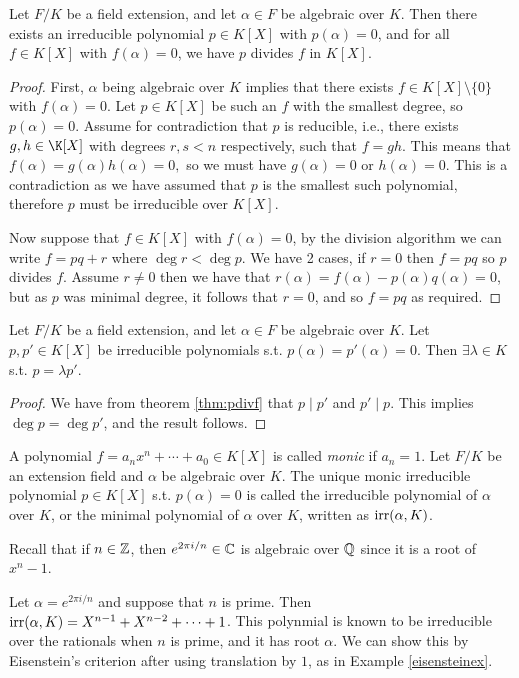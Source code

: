 \begin{theorem}
  Let $F/K$ be a field extension, and let $\alpha\in F$ be algebraic over $K$.
  Then there exists an irreducible polynomial $p\in K[X]$ with $p(\alpha)=0$, and for
  all $f\in K[X]$ with $f(\alpha)=0$, we have $p$ divides $f$ in $K[X]$. \label{thm:pdivf}
\end{theorem}
\begin{proof}
  First, $\alpha$ being algebraic over $K$ implies that there exists $f\in K[X]\setminus \{0\}$ with $f(\alpha)=0$. Let $p\in K[X]$ be such an $f$ with the smallest degree, so $p(\alpha)=0.$ Assume for contradiction that $p$ is reducible, i.e., there exists $g,h\in\K[X]$ with degrees $r,s<n$ respectively, such that $f=gh.$ This means that $f(\alpha)=g(\alpha)h(\alpha)=0,$ so we must have $g(\alpha)=0$ or $h(\alpha)=0.$ This is a contradiction as we have assumed that $p$ is the smallest such polynomial, therefore $p$ must be irreducible over $K[X].$

  Now suppose that $f \in K[X]$ with $f(\alpha) = 0$, by the division algorithm we can write $f=pq+r$ where $\deg r < \deg p$. We have 2 cases, if $r=0$ then $f = pq$ so $p$ divides $f$. Assume $r \neq 0$ then we have that $r(\alpha) = f(\alpha) - p(\alpha)q(\alpha) = 0$, but as $p$ was minimal degree, it follows that $r = 0$, and so $f=pq$ as required.
\end{proof}


\begin{corollary}
  Let $F/K$ be a field extension, and let $\alpha\in F$ be algebraic over $K$. Let
  $p,p'\in K[X]$ be irreducible polynomials s.t. $p(\alpha)=p'(\alpha)=0$. Then
  $\exists\lambda\in K$ s.t. $p=\lambda p'$.
\end{corollary}
\begin{proof}
  We have from theorem \ref{thm:pdivf} that $p \mid p'$ and $p' \mid p$. This implies $\deg p=\deg p'$, and the result follows.
\end{proof}

\begin{definition}
  A polynomial $f=a_nx^n+\cdots+a_0\in K[X]$ is called \emph{monic} if $a_n=1$.
  Let $F/K$ be an extension field and $\alpha$ be algebraic over $K$. The unique monic
  irreducible polynomial $p\in K[X]$ s.t. $p(\alpha)=0$ is called the irreducible
  polynomial of $\alpha$ over $K$, or the minimal polynomial of $\alpha$ over $K$, written
  as $\operatorname{irr} (\alpha, K)$.
\end{definition}

\begin{example}
  Recall that if $n\in\mathbb Z$, then $e^{2\pi i/n}\in\mathbb C$ is algebraic over $\mathbb Q$ since it is a
  root of $x^n-1$.
  
  Let $\alpha =e^{2\pi i/n}$ and suppose that $n$ is prime. Then $\operatorname{irr} (\alpha, K)=
  X^{n-1}+X^{n-2}+\cdots+1$. This polynmial is known to be irreducible over the rationals when $n$ is prime, and it has root $\alpha.$ We can show this by Eisenstein's criterion after using translation by $1$, as in Example \ref{eisensteinex}.
\end{example}


